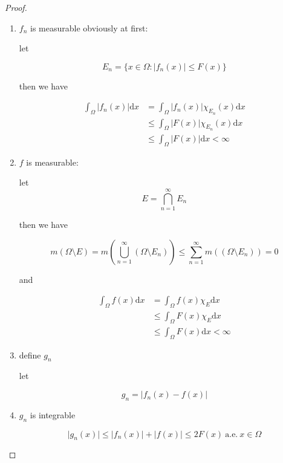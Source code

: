 \documentclass[11pt,a4paper]{article}
\begin{document}
\begin{proof}
    \begin{enumerate}
        \item $f_n$ is measurable obviously at first:

            let 

            \[
                E_n = \{x \in \Omega: \lvert f_n(x)\rvert \le F(x) \}
            \]

            then we have


            \begin{align*}
                \int_{\Omega} \left| f_n(x) \right| \mathrm{d}x &= \int_{\Omega} \left| f_n(x) \right| \chi_{E_n}(x) \mathrm{d}x \\
                & \le \int_{\Omega} \left| F(x) \right| \chi_{E_n}(x) \mathrm{d}x  \\
                & \le \int_{\Omega} \left| F(x) \right| \mathrm{d}x < \infty
            \end{align*}

        \item $f$ is measurable:

        let 
        \[
            E = \bigcap_{n=1}^{\infty}E_n
        \]

        then we have

        \[
            m(\Omega \setminus E) = m(\bigcup_{n=1}^{\infty} \left(\Omega \setminus E_n \right)) \le \sum_{n=1}^{\infty}m(\left(\Omega \setminus E_n \right)) = 0
        \]

        and

        \begin{align*}
            \int_{\Omega}f(x) \mathrm{d}x &= \int_{\Omega}f(x) \chi_{E}\mathrm{d}x \\
            & \le \int_{\Omega}F(x) \chi_{E}\mathrm{d}x \\
            & \le \int_{\Omega}F(x) \mathrm{d}x < \infty
        \end{align*}

        \item define $g_n$        

        let 

        \[
            g_n = \left| f_n(x) - f(x) \right|
        \]

        \item $g_n$ is integrable

        \[
            \lvert g_n(x) \rvert \le \lvert f_n(x) \rvert + \lvert f(x) \rvert \le 2F(x) \: \text{a.e.} \: x \in \Omega
        \]


\end{enumerate}
\end{proof}
\end{document}
